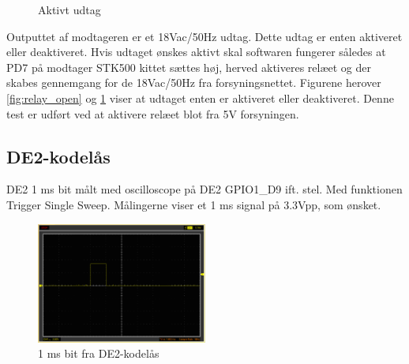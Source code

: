 \begin{figure}[H]
\begin{minipage}{0.45\textwidth}
		\caption{Aktivt udtag}
	\label{fig:relay_closed}
  \end{minipage}
\end{figure}

Outputtet af modtageren er et 18Vac/50Hz udtag. Dette udtag er enten aktiveret eller deaktiveret. Hvis udtaget ønskes aktivt skal softwaren fungerer således at PD7 på modtager STK500 kittet sættes høj, herved aktiveres relæet og der skabes gennemgang for de 18Vac/50Hz fra forsyningsnettet. Figurene herover \ref{fig:relay_open} og \ref{fig:relay_closed} viser at udtaget enten er aktiveret eller deaktiveret. Denne test er udført ved at aktivere relæet blot fra 5V forsyningen.

\subsection{DE2-kodelås}

DE2 1 ms bit målt med oscilloscope på DE2 GPIO1\_D9 ift. stel. Med funktionen Trigger Single Sweep. Målingerne viser et 1 ms signal på 3.3Vpp, som ønsket.

\begin{figure}[H]
	\centering
	\includegraphics[width=0.50\textwidth]{billeder/HWTest/DE2/DE2_1ms_pulse}
	\caption{1 ms bit fra DE2-kodelås}
	\label{code:de2_test}
\end{figure}

\clearpage